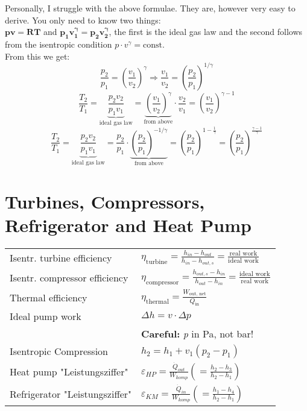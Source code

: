 Personally, I struggle with the above formulae. They are, however very easy to derive. You only need to know two things: \\
$\mathbf{ pv = RT }$ and $ \mathbf{ p_1 v_1^\gamma = p_2 v_2^\gamma }$, the first is the ideal gas law and the second follows from the isentropic condition $p\cdot v^\gamma = \text{const.}$ \\
From this we get:
	$$\frac{p_2}{p_1} = \left( \frac{v_1}{v_2} \right)^\gamma  \Rightarrow \frac{v_1}{v_2} = \left( \frac{p_2}{p_1} \right)^{1/\gamma}$$
	$$ \frac{T_2}{T_1} = \underbrace{ \frac{p_2 v_2}{p_1 v_1}}_{\text{ideal gas law}} = \underbrace{\left( \frac{v_1}{v_2} \right)^\gamma}_{\text{from above}} \cdot \frac{v_2}{v_1} = \left( \frac{v_1}{v_2} \right)^{\gamma -1} $$
	$$ \frac{T_2}{T_1} = \underbrace{ \frac{p_2 v_2}{p_1 v_1}}_{\text{ideal gas law}} = \frac{p_2}{p_1} \cdot \underbrace{ \left( \frac{p_2}{p_1} \right)^{-1/\gamma}}_{\text{from above}} = \left( \frac{p_2}{p_1} \right)^{1 - \frac{1}{\gamma}} = \left( \frac{p_2}{p_1} \right)^{\frac{\gamma -1}{\gamma}}$$

\section*{Turbines, Compressors, Refrigerator and Heat Pump}
    \begin{tabular}{ m{5cm} l}
    Isentr. turbine efficiency & $\eta_{\text{turbine}} = \frac{h_{in} - h_{out}}{h_{in} - h_{out,s}} = \frac{\text{real work}}{\text{ideal work}} $ \\
    Isentr. compressor efficiency & $\eta_{\text{compressor}} = \frac{h_{out,s} - h_{in}}{h_{out} - h_{in}} = \frac{\text{ideal work}}{\text{real work}} $  \\
    Thermal efficiency & $\eta_{\text{thermal}} = \frac{W_{\text{out, net}}}{Q_{\text{in}}} $ \\
    Ideal pump work & $\Delta h = v \cdot \Delta p$ \\
    & \textbf{Careful:} \textit{p} in Pa, not bar! \\
		Isentropic Compression & $h_2 = h_1 + v_1 \left( p_2 - p_1 \right)$ \\
    Heat pump "Leistungsziffer" & $\varepsilon_{HP} = \frac{\Dot{Q}_{out}}{W_{komp}} \left( = \frac{h_2 - h_3}{h_2 - h_1} \right) $ \\
    Refrigerator "Leistungsziffer" & $\varepsilon_{KM} = \frac{\Dot{Q}_{in}}{W_{komp}} \left( = \frac{h_1 - h_4}{h_2 - h_1} \right)$ \\
    \end{tabular}

